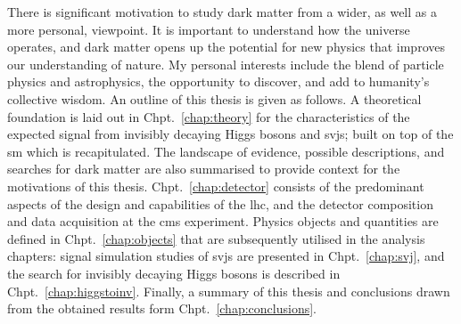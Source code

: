 There is significant motivation to study dark matter from a wider, as well as a more personal, viewpoint. It is important to understand how the universe operates, and dark matter opens up the potential for new physics that improves our understanding of nature. My personal interests include the blend of particle physics and astrophysics, the opportunity to discover, and add to humanity's collective wisdom. An outline of this thesis is given as follows. A theoretical foundation is laid out in Chpt.~\ref{chap:theory} for the characteristics of the expected signal from invisibly decaying Higgs bosons and \glspl{svj}; built on top of the \acrlong{sm} which is recapitulated. The landscape of evidence, possible descriptions, and searches for dark matter are also summarised to provide context for the motivations of this thesis. Chpt.~\ref{chap:detector} consists of the predominant aspects of the design and capabilities of the \acrlong{lhc}, and the detector composition and data acquisition at the \acrshort{cms} experiment. Physics objects and quantities are defined in Chpt.~\ref{chap:objects} that are subsequently utilised in the analysis chapters: signal simulation studies of \glspl{svj} are presented in Chpt.~\ref{chap:svj}, and the search for invisibly decaying Higgs bosons is described in Chpt.~\ref{chap:higgstoinv}. Finally, a summary of this thesis and conclusions drawn from the obtained results form Chpt.~\ref{chap:conclusions}.
